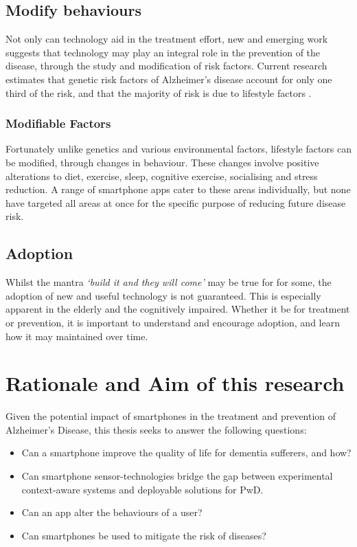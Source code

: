 \subsection{Modify behaviours}
Not only can technology aid in the treatment effort, new and emerging work suggests that technology may play an integral role in the prevention of the disease, through the study and modification of risk factors. Current research estimates that genetic risk factors of Alzheimer's disease account for only one third of the risk, and that the majority of risk is due to lifestyle factors \cite{Ridge2013}. 

\subsubsection{Modifiable Factors}
Fortunately unlike genetics and various environmental factors, lifestyle factors can be modified, through changes in behaviour. These changes involve positive alterations to diet, exercise, sleep, cognitive exercise, socialising and stress reduction. A range of smartphone apps cater to these areas individually, but none have targeted all areas at once for the specific purpose of reducing future disease risk.

\subsection{Adoption}
Whilst the mantra \textit{`build it and they will come'} may be true for for some, the adoption of new and useful technology is not guaranteed. This is especially apparent in the elderly and the cognitively impaired. Whether it be for treatment or prevention, it is important to understand and encourage adoption, and learn how it may maintained over time.

\section{Rationale and Aim of this research}
Given the potential impact of smartphones in the treatment and prevention of Alzheimer's Disease, this thesis seeks to answer the following questions:
\begin{itemize}
	\item Can a smartphone improve the quality of life for dementia sufferers, and how?
	\item Can smartphone sensor-technologies bridge the gap between experimental context-aware systems and deployable solutions for PwD.  
	\item Can an app alter the behaviours of a user?
	\item Can smartphones be used to mitigate the risk of diseases?
\end{itemize}

